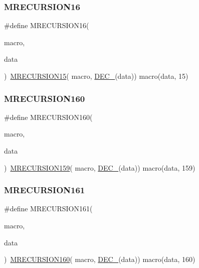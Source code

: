 \subsubsection{\texorpdfstring{MRECURSION16}{MRECURSION16}}
{\footnotesize\ttfamily \#define M\+R\+E\+C\+U\+R\+S\+I\+O\+N16(\begin{DoxyParamCaption}\item[{}]{macro,  }\item[{}]{data }\end{DoxyParamCaption})~\mbox{\hyperlink{group__group__sam0__utils__mrecursion_ga5c619eed1b00d3df2ce0cc6335cfc3ad}{M\+R\+E\+C\+U\+R\+S\+I\+O\+N15}}(  macro, \mbox{\hyperlink{group__group__sam0__utils__mrecursion_ga1d23d683797679dca8c3512a54a5dcae}{D\+E\+C\+\_\+}}(data))   macro(data, 15)}

\mbox{\label{group__group__sam0__utils__mrecursion_ga89acda6db52162017b6af2601a8ec0d4}} 
\subsubsection{\texorpdfstring{MRECURSION160}{MRECURSION160}}
{\footnotesize\ttfamily \#define M\+R\+E\+C\+U\+R\+S\+I\+O\+N160(\begin{DoxyParamCaption}\item[{}]{macro,  }\item[{}]{data }\end{DoxyParamCaption})~\mbox{\hyperlink{group__group__sam0__utils__mrecursion_gaaef0c4232ced8fccec8764fc981ef985}{M\+R\+E\+C\+U\+R\+S\+I\+O\+N159}}(  macro, \mbox{\hyperlink{group__group__sam0__utils__mrecursion_ga1d23d683797679dca8c3512a54a5dcae}{D\+E\+C\+\_\+}}(data))   macro(data, 159)}

\mbox{\label{group__group__sam0__utils__mrecursion_ga00b14059593a449a083e403139ea228b}} 
\subsubsection{\texorpdfstring{MRECURSION161}{MRECURSION161}}
{\footnotesize\ttfamily \#define M\+R\+E\+C\+U\+R\+S\+I\+O\+N161(\begin{DoxyParamCaption}\item[{}]{macro,  }\item[{}]{data }\end{DoxyParamCaption})~\mbox{\hyperlink{group__group__sam0__utils__mrecursion_ga89acda6db52162017b6af2601a8ec0d4}{M\+R\+E\+C\+U\+R\+S\+I\+O\+N160}}(  macro, \mbox{\hyperlink{group__group__sam0__utils__mrecursion_ga1d23d683797679dca8c3512a54a5dcae}{D\+E\+C\+\_\+}}(data))   macro(data, 160)}

